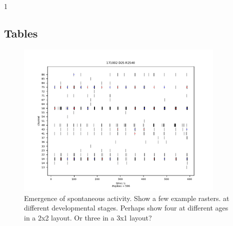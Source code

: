 1\documentclass[11pt]{article}
\begin{document}
{\label{LastPage}
\clearpage
\pagestyle{empty}


\subsection*{Tables}


\clearpage

\begin{figure}
  \centering
  \includegraphics[width=10cm]{../plots/supplementary_figures/burst_plot_3.pdf}
  \caption{Emergence of spontaneous activity.  Show a few example rasters.
    at different developmental stages.  Perhaps show four at different
  ages in a 2x2 layout.  Or three in a 3x1 layout?}
  \label{fig:rasters}
\end{figure}


}
\end{document}

